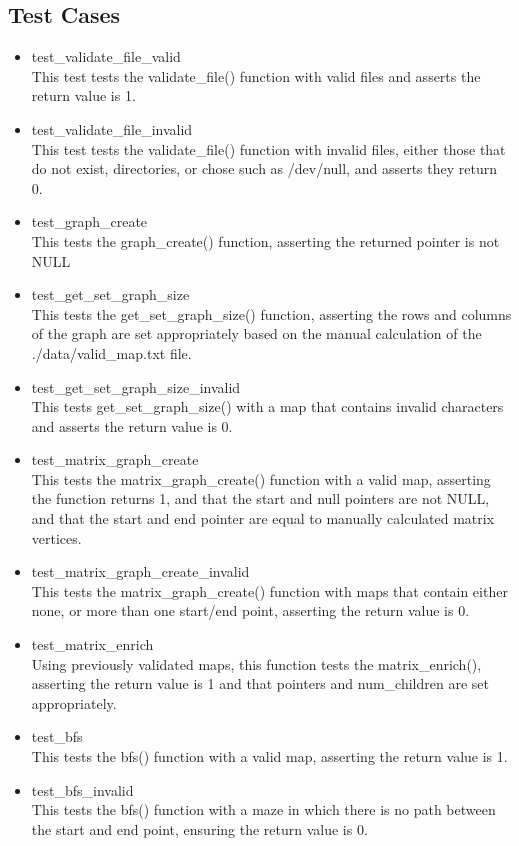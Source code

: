 \documentclass{article}
\begin{document}
    \subsection{Test Cases}
    \begin{itemize}
        \item test\_validate\_file\_valid\\
        This test tests the validate\_file() function with valid files and asserts the return value is 1.
        \item test\_validate\_file\_invalid\\
        This test tests the validate\_file() function with invalid files, either those that do not exist, directories, or chose such as /dev/null, and asserts they return 0.
        \item test\_graph\_create\\
        This tests the graph\_create() function, asserting the returned pointer is not NULL
        \item test\_get\_set\_graph\_size\\
        This tests the get\_set\_graph\_size() function, asserting the rows and columns of the graph are set appropriately based on the manual calculation of the ./data/valid\_map.txt file. 
        \item test\_get\_set\_graph\_size\_invalid\\
        This tests get\_set\_graph\_size() with a map that contains invalid characters and asserts the return value is 0.
        \item test\_matrix\_graph\_create\\
        This tests the matrix\_graph\_create() function with a valid map, asserting the function returns 1, and that the start and null pointers are not NULL, and that the start and end pointer are equal to manually calculated matrix vertices.
        \item test\_matrix\_graph\_create\_invalid\\
        This tests the matrix\_graph\_create() function with maps that contain either none, or more than one start/end point, asserting the return value is 0.
        \item test\_matrix\_enrich\\
        Using previously validated maps, this function tests the matrix\_enrich(), asserting the return value is 1 and that pointers and num\_children are set appropriately.
        \item test\_bfs\\
        This tests the bfs() function with a valid map, asserting the return value is 1.
        \item test\_bfs\_invalid\\
        This tests the bfs() function with a maze in which there is no path between the start and end point, ensuring the return value is 0.
    \end{itemize}
\end{document}
